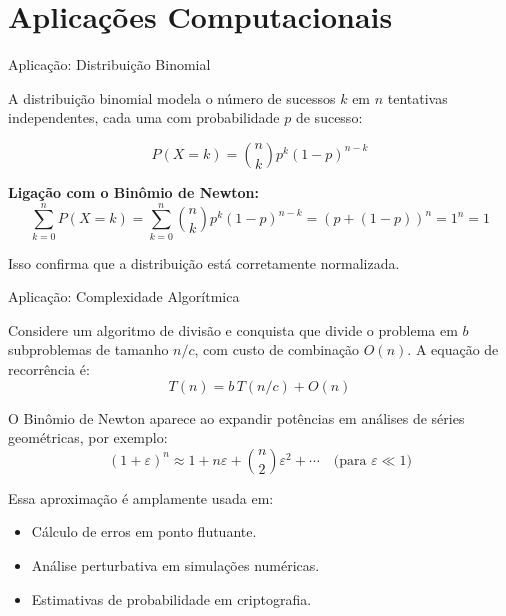 \documentclass[9pt]{beamer}
\begin{document}
\section{Aplicações Computacionais}

\begin{frame}{Aplicação: Distribuição Binomial}

A distribuição binomial modela o número de sucessos $k$ em $n$ tentativas independentes, cada uma com probabilidade $p$ de sucesso:
 
\[
P(X = k) = \binom{n}{k} p^k (1-p)^{n-k}
\]

\vspace{0.3cm}

\textbf{Ligação com o Binômio de Newton:}
\[
\sum_{k=0}^{n} P(X=k) = \sum_{k=0}^{n} \binom{n}{k} p^k (1-p)^{n-k} = (p + (1-p))^n = 1^n = 1
\]

\vspace{0.3cm}

Isso confirma que a distribuição está corretamente normalizada.
\end{frame}


\begin{frame}{Aplicação: Complexidade Algorítmica}

Considere um algoritmo de divisão e conquista que divide o problema em $b$ subproblemas de tamanho $n/c$, com custo de combinação $O(n)$. A equação de recorrência é:
\[
T(n) = b\,T(n/c) + O(n)
\]

\vspace{0.2cm}

O Binômio de Newton aparece ao expandir potências em análises de séries geométricas, por exemplo:
\[
(1+\varepsilon)^n \approx 1 + n\varepsilon + \binom{n}{2}\varepsilon^2 + \cdots \quad \text{(para } \varepsilon \ll 1\text{)}
\]

Essa aproximação é amplamente usada em:
\begin{itemize}
    \item Cálculo de erros em ponto flutuante.
    \item Análise perturbativa em simulações numéricas.
    \item Estimativas de probabilidade em criptografia.
\end{itemize}
\end{frame}
\end{document}
